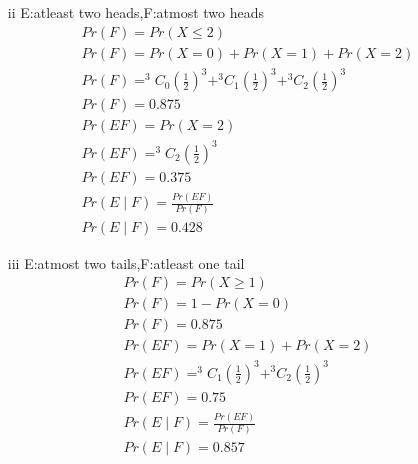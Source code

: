\documentclass{article}
\begin{document}
\begin{enumerate}[label=13.\arabic{enumi}.\arabic{enumii}]
\item[ii] E:atleast two heads,F:atmost two heads\\
\begin{align}
Pr(F)=Pr(X\leq2)\\
Pr(F)=Pr(X=0)+Pr(X=1)+Pr(X=2)\\
Pr(F)=^{3}C_0 (\frac{1}{2})^{3}+ ^{3}C_1 (\frac{1}{2})^{3}+ ^{3}C_2 (\frac{1}{2})^{3}\\
Pr(F)=0.875\\
Pr(EF)=Pr(X=2)\\
Pr(EF)= ^{3}C_2 (\frac{1}{2})^{3}\\
Pr(EF)=0.375\\
Pr(E \mid F)=\frac{Pr(EF)}{Pr(F)}\\
Pr(E \mid F)=0.428
\end{align}
%

\item[iii]E:atmost two tails,F:atleast one tail\\
\begin{align}
Pr(F)=Pr(X\geq1)\\
Pr(F)=1-Pr(X=0)\\
Pr(F)=0.875\\
Pr(EF)=Pr(X=1)+Pr(X=2)\\
Pr(EF)=^{3}C_1 (\frac{1}{2})^{3}+^{3}C_2 (\frac{1}{2})^{3}\\
Pr(EF)=0.75\\
Pr(E \mid F)=\frac{Pr(EF)}{Pr(F)}\\
Pr(E \mid F)=0.857
\end{align}
%
\end{enumerate}
\end{document}
